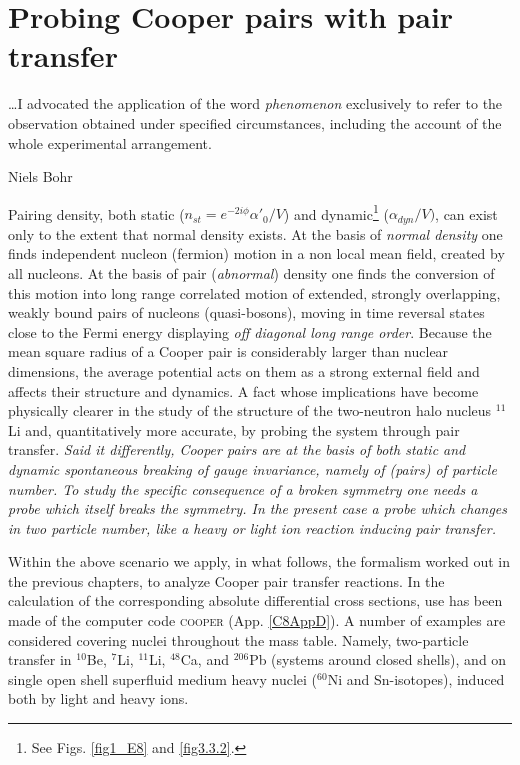  \chapter{Probing Cooper pairs with pair transfer}\label{C8}
  \epigraph{\dots I advocated the application of the word \textit{phenomenon} exclusively to refer to the observation obtained under specified circumstances, including the account of the whole experimental arrangement.}{Niels Bohr}
Pairing density, both static ($n_{st}=e^{-2i\phi}\alpha'_0/V$) and dynamic\footnote{See Figs. \ref{fig1_E8} and \ref{fig3.3.2}.} ($\alpha_{dyn}/V)$, can exist only to the extent that normal density exists. At the basis of \textit{normal density} one finds independent nucleon (fermion) motion in a non local mean field, created by all nucleons. At the basis of pair (\textit{abnormal}) density one finds the conversion of this motion into long range correlated motion of extended, strongly overlapping, weakly bound pairs  of nucleons (quasi-bosons), moving in time reversal states close to the Fermi energy displaying \textit{off diagonal long range order}. Because the mean square radius of a Cooper pair is considerably larger than nuclear dimensions, the average potential acts on them as a strong external field and affects their structure and dynamics. A fact whose implications have become physically clearer in the study of the structure of the two-neutron  halo nucleus $^{11}$Li and, quantitatively more accurate, by probing the system through pair transfer. \textit{Said it differently, Cooper pairs are at the basis of both static and dynamic spontaneous breaking of gauge invariance, namely of (pairs) of particle number. To study the specific consequence of a broken symmetry one needs a probe which itself breaks the symmetry. In the present case a probe which changes in two particle number, like a heavy or light ion reaction inducing  pair transfer.}

Within the above scenario we apply, in   what follows, the formalism worked out in the previous chapters, to analyze Cooper pair transfer reactions. In the calculation of the corresponding absolute differential cross sections, use has been made of the computer code \textsc{cooper} (App. \ref{C8AppD}).
 A number of examples are considered covering nuclei throughout the mass table. Namely,   two-particle transfer  in $^{10}$Be,    $^{7}$Li, $^{11}$Li, $^{48}$Ca, and $^{206}$Pb (systems around closed shells), and on single open shell superfluid   medium heavy nuclei ($^{60}$Ni and Sn-isotopes), induced both by light and heavy ions.
